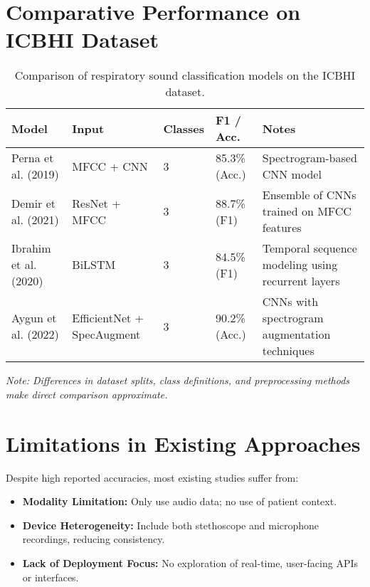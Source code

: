 \section{Comparative Performance on ICBHI Dataset}
\begin{table}[h!]
\centering
\small
\renewcommand{\arraystretch}{1.2}
\begin{tabular}{|p{3.2cm}|p{2.2cm}|p{1.5cm}|p{2.2cm}|p{4cm}|}
\hline
\textbf{Model} & \textbf{Input} & \textbf{Classes} & \textbf{F1 / Acc.} & \textbf{Notes} \\
\hline
Perna et al. (2019) \cite{perna2019} & MFCC + CNN & 3 & 85.3\% (Acc.) & Spectrogram-based CNN model \\
Demir et al. (2021) \cite{demir2021} & ResNet + MFCC & 3 & 88.7\% (F1) & Ensemble of CNNs trained on MFCC features \\
Ibrahim et al. (2020) \cite{ibrahim2020} & BiLSTM & 3 & 84.5\% (F1) & Temporal sequence modeling using recurrent layers \\
Aygun et al. (2022) \cite{aygun2022} & EfficientNet + SpecAugment & 3 & 90.2\% (Acc.) & CNNs with spectrogram augmentation techniques \\
\hline
\end{tabular}
\caption{Comparison of respiratory sound classification models on the ICBHI dataset.}
\label{tab:icbhi_comparison}
\end{table}
\vspace{0.5em}
\textit{Note: Differences in dataset splits, class definitions, and preprocessing methods make direct comparison approximate.}

\section{Limitations in Existing Approaches}
Despite high reported accuracies, most existing studies suffer from:
\begin{itemize}
    \item \textbf{Modality Limitation:} Only use audio data; no use of patient context.
    \item \textbf{Device Heterogeneity:} Include both stethoscope and microphone recordings, reducing consistency.
    \item \textbf{Lack of Deployment Focus:} No exploration of real-time, user-facing APIs or interfaces.
\end{itemize}

